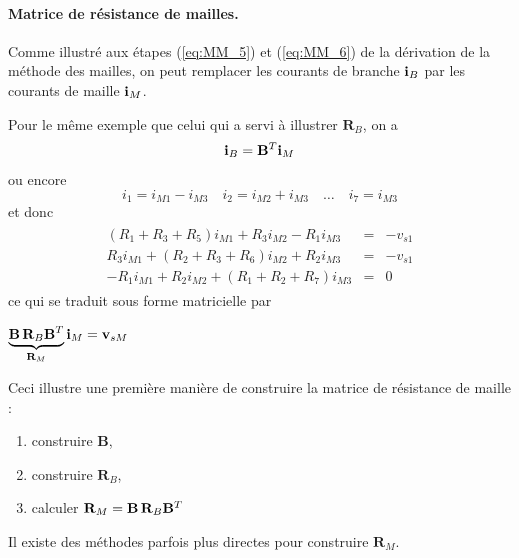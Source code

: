 \paragraph{Matrice de résistance de mailles.} %
Comme illustré aux étapes (\ref{eq:MM_5}) et (\ref{eq:MM_6}) de la dérivation de la méthode des mailles, on peut remplacer les courants de branche ${\bf i}_B$ par les courants de maille ${\bf i}_M$.
\begin{testexample} Pour le même exemple que celui qui a servi à illustrer $\mathbf{R}_B$, on a 
	$${\bf i}_B = {\bf B}^T {\bf i}_M$$ ou encore 
	$$i_1 =  i_{M1}-i_{M3} \quad 
	i_2 =  i_{M2}+i_{M3} \quad 
	\ldots \quad 
	i_7 =  i_{M3}$$
	et donc 
	\begin{gather*}
	\begin{array}{rcl}
	(R_1+R_3+R_5) i_{M1}+R_3 i_{M2}-R_1 i_{M3}& = & -v_{s1}\\
	R_3 i_{M1} + (R_2+R_3+R_6)i_{M2}+R_2 i_{M3} & = & -v_{s1}\\
	-R_1 i_{M1} + R_2 i_{M2} + (R_1+R_2+R_7) i_{M3} & = & 0
	\end{array}
	\end{gather*}
	ce qui se traduit sous forme matricielle par
	\begin{center}
		$\underbrace{{\bf B}\,{\bf R}_B {\bf B}^T}_{{\bf R}_M}{\bf i}_M = {\bf v}_{sM}$
	\end{center}
\end{testexample}

Ceci illustre une première manière de construire la matrice de résistance de maille : 
\begin{enumerate}
	\item construire $\mathbf{B}$,
	\item construire $\mathbf{R}_B$,
	\item calculer $\mathbf{R}_M = {\bf B}\,{\bf R}_B {\bf B}^T$
\end{enumerate}
Il existe des méthodes parfois plus directes pour construire $\mathbf{R}_M$.


